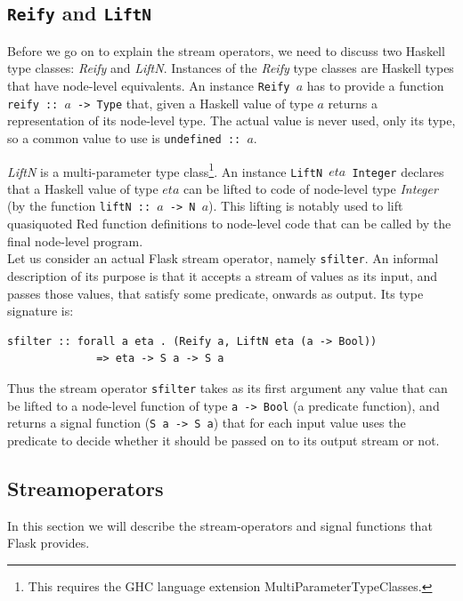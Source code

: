 \documentclass[a4paper, oneside, final]{memoir}
\begin{document}
\subsection{\texttt{Reify} and \texttt{LiftN}}
Before we go on to explain the stream operators, we need to discuss
two Haskell type classes: \textit{Reify} and \textit{LiftN}.
Instances of the \textit{Reify} type classes are Haskell types that
have node-level equivalents. An instance \texttt{Reify $a$} has to
provide a function \texttt{reify :: $a$ -> Type} that, given a Haskell
value of type $a$ returns a representation of its node-level type.
The actual value is never used, only its type, so a common value to
use is \texttt{undefined :: $a$}. \hfill

\textit{LiftN} is a multi-parameter type class\footnote{This requires
  the GHC language extension MultiParameterTypeClasses.}. An instance
\texttt{LiftN $eta$ Integer} declares that a Haskell value of type
$eta$ can be lifted to code of node-level type \textit{Integer} (by
the function \texttt{liftN :: $a$ -> N $a$}).  This lifting is notably
used to lift quasiquoted Red function definitions to
node-level code that can be called by the final node-level program.\\

\noindent
Let us consider an actual Flask stream operator, namely
\texttt{sfilter}. An informal description of its purpose is that it
accepts a stream of values as its input, and passes those values, that
satisfy some predicate, onwards as output.  Its type signature is:

\begin{verbatim}
sfilter :: forall a eta . (Reify a, LiftN eta (a -> Bool))
              => eta -> S a -> S a
\end{verbatim}

Thus the stream operator \texttt{sfilter} takes as its first argument
any value that can be lifted to a node-level function of type
\texttt{a -> Bool} (a predicate function), and returns a signal
function (\texttt{S a -> S a}) that for each input value uses the
predicate to decide whether it should be passed on to its output
stream or not.


\subsection{Streamoperators}
\label{sec:streamoperators}
In this section we will describe the stream-operators and signal
functions that Flask provides.
\end{document}
